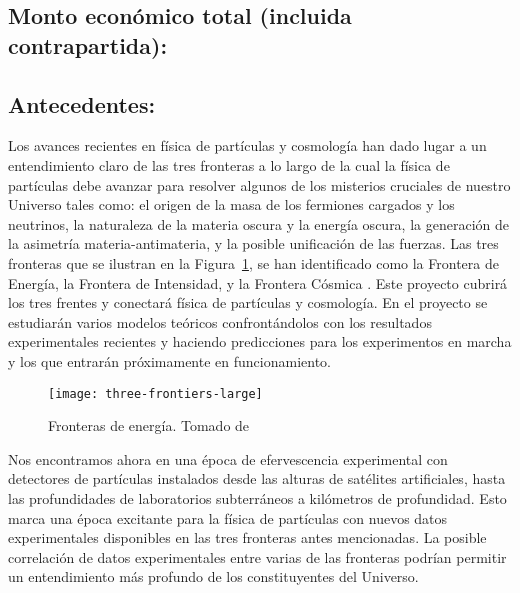\subsection{Monto económico total (incluida contrapartida):}
\subsection{Antecedentes:                                  }
Los avances recientes en física de partículas y cosmología han dado
lugar a un entendimiento claro de las tres fronteras a lo largo de la
cual la física de partículas debe avanzar para resolver algunos de los
misterios cruciales de nuestro Universo tales como: el origen de la
masa de los fermiones cargados y los neutrinos, la naturaleza de la
materia oscura y la energía oscura, la generación de la asimetría
materia-antimateria, y la posible unificación de las fuerzas. Las tres
fronteras que se ilustran en la Figura~\ref{fig:1}, se han
identificado como la Frontera de Energía, la Frontera de Intensidad, y
la Frontera Cósmica \cite{fermilab}. Este proyecto cubrirá los tres
frentes y conectará física de partículas y cosmología. En el proyecto
se estudiarán varios modelos teóricos confrontándolos con los
resultados experimentales recientes y haciendo predicciones para los
experimentos en marcha y los que entrarán próximamente en
funcionamiento.

\begin{figure}
  \centering
\texttt{[image: three-frontiers-large]}
  \caption{Fronteras de energía. Tomado de \cite{fermilab}}
  \label{fig:1}
\end{figure}

Nos encontramos ahora en una época de efervescencia experimental con
detectores de partículas instalados desde las alturas de satélites
artificiales, hasta las profundidades de laboratorios subterráneos a
kilómetros de profundidad. Esto marca una época excitante para la
física de partículas con nuevos datos experimentales disponibles en
las tres fronteras antes mencionadas. La posible correlación de datos
experimentales entre varias de las fronteras podrían permitir un
entendimiento más profundo de los constituyentes del Universo.

